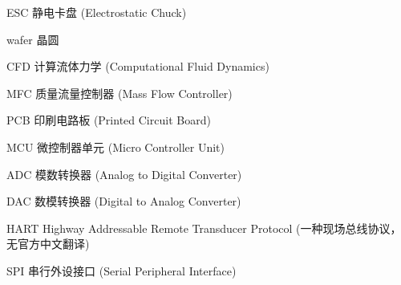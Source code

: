 \begin{denotation}

\item[ESC] 静电卡盘 (Electrostatic Chuck)
\item[wafer] 晶圆
\item[CFD] 计算流体力学 (Computational Fluid Dynamics)
\item[MFC] 质量流量控制器 (Mass Flow Controller)
\item[PCB] 印刷电路板 (Printed Circuit Board)
\item[MCU] 微控制器单元 (Micro Controller Unit)
\item[ADC] 模数转换器 (Analog to Digital Converter)
\item[DAC] 数模转换器 (Digital to Analog Converter)
\item[HART] Highway Addressable Remote Transducer Protocol (一种现场总线协议，无官方中文翻译)
\item[SPI] 串行外设接口 (Serial Peripheral Interface)


\end{denotation}
